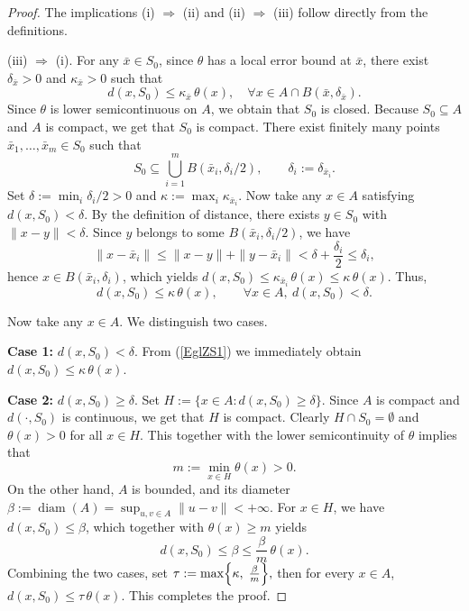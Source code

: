 \documentclass[11pt]{article}
\begin{document}
\begin{proof}
	The implications (i) $\Rightarrow$ (ii) and (ii) $\Rightarrow$ (iii) follow directly from the definitions.
	
	(iii) $\Rightarrow$ (i).
	For any $\bar x\in S_0$, since $\theta$ has a local error bound at $\bar x$, there exist  $\delta_{\bar x} >0$ and $\kappa_{\bar x}>0$ such that
	\[
	d(x,S_0)\le \kappa_{\bar x}\,\theta(x), \quad \forall x\in A\cap B(\bar x,\delta_{\bar x}).
	\]
	Since    $\theta$ is lower semicontinuous on $A$, we obtain that   $S_0$ is closed.   Because $S_0 \subseteq A$ and $A$ is compact,  we get that  $S_0$ is compact. There exist finitely many points $\bar x_1,\dots,\bar x_m\in S_0$ such that
	\[
	S_0 \subseteq\bigcup_{i=1}^{m}B(\bar x_i,\delta_i/2),\qquad \delta_i:=\delta_{\bar x_i}.
	\]
	Set $\delta:=\min_i\delta_i/2>0$ and $\kappa:=\max_i\kappa_{\bar x_i}$. Now take any $x\in A$ satisfying $d(x,  S_0)<\delta$. By the definition of distance, there exists $y\in S_0$ with $\|x-y\|<\delta$. Since $y$ belongs to some $B(\bar x_i,\delta_i/2)$, we have
	\[
	\|x-\bar x_i\|\le\|x-y\|+\|y-\bar x_i\|<\delta+\frac{\delta_i}{2}\le\delta_i,
	\]
	hence $x\in B(\bar x_i,\delta_i)$, which yields
	$	d(x,S_0)\le \kappa_{\bar x_i}\,\theta(x)\le\kappa\,\theta(x).$
	Thus,
	\begin{equation} \label{EglZS1}
		d(x,S_0)\le \kappa\,\theta(x),\qquad \forall x\in A,\ d(x,S_0)<\delta.  
	\end{equation}
	
	
	
	
	
	Now take any $x\in A$. We distinguish two cases.
	
	\noindent\textbf{Case 1:} $d(x,S_0)<\delta$.  From (\ref{EglZS1}) we immediately obtain
	$	d(x,S_0)\le \kappa\,\theta(x).$
	
	\noindent\textbf{Case 2:} $d(x,S_0)\ge \delta$. Set
	$	H:=\bigl\{x\in A : d(x,S_0)\ge \delta\bigr\}.$
	Since	$A$ is compact and $d(\cdot,S_0)$ is continuous, we get that $H$ is compact. Clearly $H\cap S_0 =\emptyset$ and $\theta(x)>0$ for all $x\in H$. 
	This together with the lower semicontinuity of $\theta$  implies that
	\[
	m:=\min_{x\in H}\theta(x)>0.
	\]
	On the other hand, $A$ is bounded, and its diameter $\beta:=\operatorname{diam}(A)=\sup_{u,v\in A}\|u-v\|<+\infty$. For $x\in H$, we have $d(x,S_0)\le \beta$, which together with $\theta(x)\ge m$ yields
	\[
	d(x,S_0)\le \beta \le \frac{\beta}{m}\,\theta(x).
	\]
		Combining the two cases, set
	$	\tau := \max\Bigl\{\kappa,\;\frac{\beta}{m}\Bigr\}, $
	then for every $x\in A$,
	$	d(x,S_0)\le \tau \,\theta(x).$   	This completes the proof. 
\end{proof}
\end{document}
